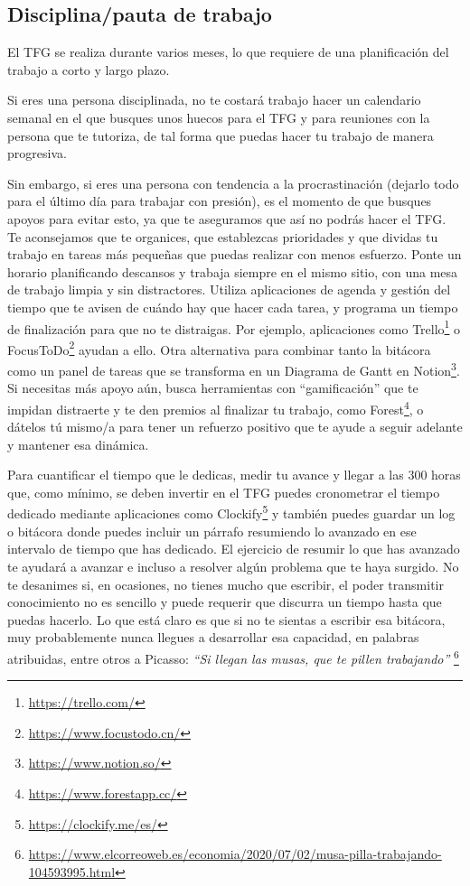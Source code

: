 \subsection{Disciplina/pauta de trabajo}%

El TFG se realiza durante varios meses, lo que requiere de una planificación del trabajo a corto y largo plazo. 

Si eres una persona disciplinada, no te costará trabajo hacer un calendario semanal en el que busques unos huecos para el TFG y para reuniones con la persona que te tutoriza, de tal forma que puedas hacer tu trabajo de manera progresiva. 

Sin embargo, si eres una persona con tendencia a la procrastinación (dejarlo todo para el último día para trabajar con presión), es el momento de que busques apoyos para evitar esto, ya que te aseguramos que así no podrás hacer el TFG. Te aconsejamos que te organices, que establezcas prioridades y que dividas tu trabajo en tareas más pequeñas que puedas realizar con menos esfuerzo. Ponte un horario planificando descansos y trabaja siempre en el mismo sitio, con una mesa de trabajo limpia y sin distractores. Utiliza aplicaciones de agenda y gestión del tiempo que te avisen de cuándo hay que hacer cada tarea, y programa un tiempo de finalización para que no te distraigas. Por ejemplo, aplicaciones como {Trello}\footnote{\url{https://trello.com/}} o {FocusToDo}\footnote{\url{https://www.focustodo.cn/}} ayudan a ello. Otra alternativa para combinar tanto la bitácora como un panel de tareas que se transforma en un Diagrama de Gantt en {Notion}\footnote{\url{https://www.notion.so/}}. Si necesitas más apoyo aún, busca herramientas con ``gamificación'' que te impidan distraerte y te den premios al finalizar tu trabajo, como {Forest}\footnote{\url{https://www.forestapp.cc/}}, o dátelos tú mismo/a para tener un refuerzo positivo que te ayude a seguir adelante y mantener esa dinámica. 

Para cuantificar el tiempo que le dedicas, medir tu avance y llegar a las 300 horas que, como mínimo, se deben invertir en el TFG puedes cronometrar el tiempo dedicado mediante aplicaciones como {Clockify}\footnote{\url{https://clockify.me/es/}} y también puedes guardar un log o bitácora donde puedes incluir un párrafo resumiendo lo avanzado en ese intervalo de tiempo que has dedicado. El ejercicio de resumir lo que has avanzado te ayudará a avanzar e incluso a resolver algún problema que te haya surgido. No te desanimes si, en ocasiones, no tienes mucho que escribir, el poder transmitir conocimiento no es sencillo y puede requerir que discurra un tiempo hasta que puedas hacerlo. Lo que está claro es que si no te sientas a escribir esa bitácora, muy probablemente nunca llegues a desarrollar esa capacidad, en palabras atribuidas, entre otros a Picasso: {\it ``Si llegan las musas, que te pillen trabajando''} \footnote{\url{https://www.elcorreoweb.es/economia/2020/07/02/musa-pilla-trabajando-104593995.html}}

